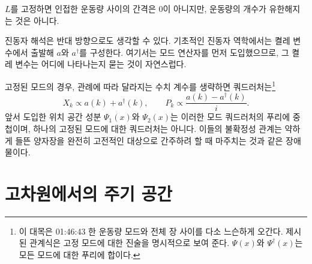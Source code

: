\(L\)를 고정하면 인접한 운동량 사이의 간격은 0이 아니지만, 운동량의 개수가 유한해지는 것은 아니다.

\begin{classroomqa}\end{classroomqa}

진동자 해석은 반대 방향으로도 생각할 수 있다. 기초적인 진동자 역학에서는 켤레 변수에서 출발해 \(a\)와 \(a^\dagger\)를 구성한다. 여기서는 모드 연산자를 먼저 도입했으므로, 그 켤레 변수는 어디에 나타나는지 묻는 것이 자연스럽다.

\begin{classroomqa}\end{classroomqa}

고정된 모드의 경우, 관례에 따라 달라지는 수치 계수를 생략하면 쿼드러처는\footnote{ 이 대목은 01:46:43 한 운동량 모드와 전체 장 사이를 다소 느슨하게 오간다. 제시된 관계식은 고정 모드에 대한 진술을 명시적으로 보여 준다. \(\Psi(x)\)와 \(\Psi^\dagger(x)\)는 모든 모드에 대한 푸리에 합이다.}
\begin{equation}
X_k\propto a(k)+a^\dagger(k),
\qquad
P_k\propto \frac{a(k)-a^\dagger(k)}{i}.
\end{equation}
앞서 도입한 위치 공간 성분 \(\Psi_1(x)\)와 \(\Psi_2(x)\)는 이러한 모드 쿼드러처의 푸리에 중첩이며, 하나의 고정된 모드에 대한 쿼드러처는 아니다. 이들의 불확정성 관계는 약하게 들뜬 양자장을 완전히 고전적인 대상으로 간주하려 할 때 마주치는 것과 같은 장애물이다.

\section{고차원에서의 주기 공간}

\begin{classroomqa}\end{classroomqa}

